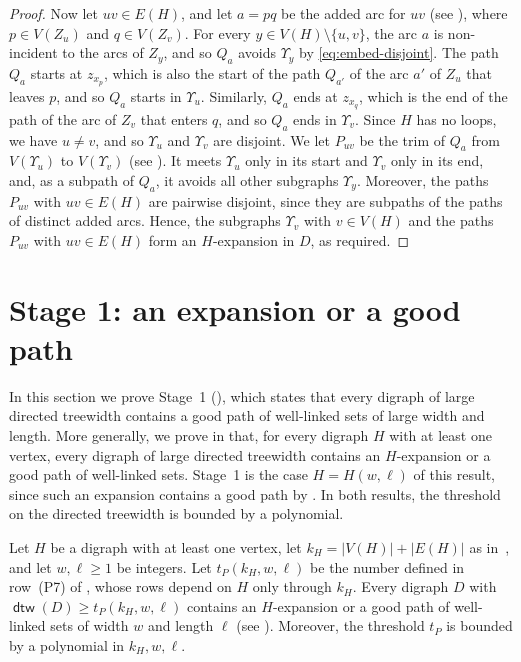 \documentclass[fontsize=12pt,leading=14pt]{fullpaper}
\DeclareMathOperator{\dtw}{\mathsf{dtw}}
\newcommand{\Hwl}{H(w,\ell)}
\begin{document}
\begin{proof}
  Now let $uv\in E(H)$, and let $a=pq$ be the added arc for $uv$ (see ), where $p\in V(Z_u)$ and $q\in V(Z_v)$.
  For every $y\in V(H)\setminus\{u,v\}$, the arc $a$ is non-incident to the arcs of $Z_y$, and so $Q_a$ avoids $\Upsilon_y$ by \eqref{eq:embed-disjoint}.
  The path $Q_a$ starts at $z_{x_p}$, which is also the start of the path $Q_{a'}$ of the arc $a'$ of $Z_u$ that leaves $p$, and so $Q_a$ starts in $\Upsilon_u$.
  Similarly, $Q_a$ ends at $z_{x_q}$, which is the end of the path of the arc of $Z_v$ that enters $q$, and so $Q_a$ ends in $\Upsilon_v$.
  Since $H$ has no loops, we have $u\ne v$, and so $\Upsilon_u$ and $\Upsilon_v$ are disjoint.
  We let $P_{uv}$ be the trim of $Q_a$ from $V(\Upsilon_u)$ to $V(\Upsilon_v)$ (see ).
  It meets $\Upsilon_u$ only in its start and $\Upsilon_v$ only in its end, and, as a subpath of $Q_a$, it avoids all other subgraphs $\Upsilon_y$.
  Moreover, the paths $P_{uv}$ with $uv\in E(H)$ are pairwise disjoint, since they are subpaths of the paths of distinct added arcs.
  Hence, the subgraphs $\Upsilon_v$ with $v\in V(H)$ and the paths $P_{uv}$ with $uv\in E(H)$ form an $H$-expansion in $D$, as required.
\end{proof}

%
\section{Stage 1: an expansion or a good path}\label{sec:stage1}

In this section we prove Stage~1 (), which states that every digraph of large directed treewidth contains a good path of well-linked sets of large width and length.
More generally, we prove in  that, for every digraph $H$ with at least one vertex, every digraph of large directed treewidth contains an $H$-expansion or a good path of well-linked sets.
Stage~1 is the case $H=\Hwl$ of this result, since such an expansion contains a good path by .
In both results, the threshold on the directed treewidth is bounded by a polynomial.

\begin{theorem}\label{thm:main}
  Let $H$ be a digraph with at least one vertex, let $k_H=|V(H)|+|E(H)|$ as in~, and let $w,\ell\ge1$ be integers.
  Let $t_P(k_H,w,\ell)$ be the number defined in row~(P7) of , whose rows depend on $H$ only through $k_H$.
  Every digraph $D$ with $\dtw(D)\ge t_P(k_H,w,\ell)$ contains an $H$-expansion or a good path of well-linked sets of width $w$ and length $\ell$ (see ).
  Moreover, the threshold $t_P$ is bounded by a polynomial in $k_H,w,\ell$.
\end{theorem}
\end{document}
